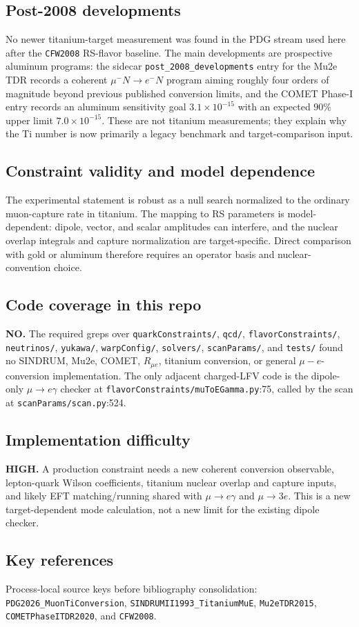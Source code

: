 \subsection*{Post-2008 developments}
No newer titanium-target measurement was found in the PDG stream used here
after the \texttt{CFW2008} RS-flavor baseline.  The main developments are
prospective aluminum programs: the sidecar \texttt{post\_2008\_developments}
entry for the Mu2e TDR records a coherent \(\mu^-N\to e^-N\) program aiming
roughly four orders of magnitude beyond previous published conversion limits,
and the COMET Phase-I entry records an aluminum sensitivity goal
\(3.1\times10^{-15}\) with an expected \(90\%\) upper limit
\(7.0\times10^{-15}\).  These are not titanium measurements; they explain why
the Ti number is now primarily a legacy benchmark and target-comparison input.

\subsection*{Constraint validity and model dependence}
The experimental statement is robust as a null search normalized to the
ordinary muon-capture rate in titanium.  The mapping to RS parameters is
model-dependent: dipole, vector, and scalar amplitudes can interfere, and the
nuclear overlap integrals and capture normalization are target-specific.
Direct comparison with gold or aluminum therefore requires an operator basis
and nuclear-convention choice.

\subsection*{Code coverage in this repo}
\textbf{NO.}  The required greps over \texttt{quarkConstraints/}, \texttt{qcd/},
\texttt{flavorConstraints/}, \texttt{neutrinos/}, \texttt{yukawa/},
\texttt{warpConfig/}, \texttt{solvers/}, \texttt{scanParams/}, and
\texttt{tests/} found no SINDRUM, Mu2e, COMET, \(R_{\mu e}\), titanium
conversion, or general \(\mu-e\)-conversion implementation.  The only adjacent
charged-LFV code is the dipole-only \(\mu\to e\gamma\) checker at
\texttt{flavorConstraints/muToEGamma.py}:75, called by the scan at
\texttt{scanParams/scan.py}:524.

\subsection*{Implementation difficulty}
\textbf{HIGH.}  A production constraint needs a new coherent conversion
observable, lepton-quark Wilson coefficients, titanium nuclear overlap and
capture inputs, and likely EFT matching/running shared with \(\mu\to e\gamma\)
and \(\mu\to3e\).  This is a new target-dependent mode calculation, not a new
limit for the existing dipole checker.

\subsection*{Key references}
Process-local source keys before bibliography consolidation:
\texttt{PDG2026\_MuonTiConversion}, \texttt{SINDRUMII1993\_TitaniumMuE},
\texttt{Mu2eTDR2015}, \texttt{COMETPhaseITDR2020}, and \texttt{CFW2008}.
